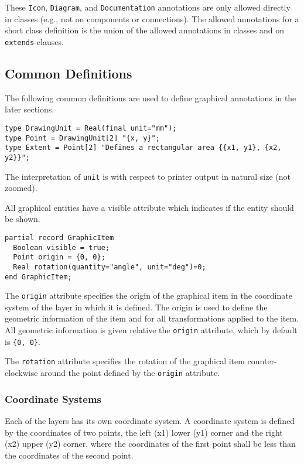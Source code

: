 These \lstinline!Icon!, \lstinline!Diagram!, and \lstinline!Documentation! annotations are only allowed directly in classes (e.g., not on components or connections).
The allowed annotations for a short class definition is the union of the allowed annotations in classes and on \lstinline!extends!-clauses.

\subsection{Common Definitions}\label{common-definitions}

The following common definitions are used to define graphical annotations in the later sections.
\begin{lstlisting}[language=modelica]
type DrawingUnit = Real(final unit="mm");
type Point = DrawingUnit[2] "{x, y}";
type Extent = Point[2] "Defines a rectangular area {{x1, y1}, {x2, y2}}";
\end{lstlisting}%
The interpretation of \lstinline!unit! is with respect to printer output in natural size (not zoomed).

All graphical entities have a visible attribute which indicates if the entity should be shown.
\begin{lstlisting}[language=modelica]
partial record GraphicItem
  Boolean visible = true;
  Point origin = {0, 0};
  Real rotation(quantity="angle", unit="deg")=0;
end GraphicItem;
\end{lstlisting}%
The \lstinline!origin! attribute specifies the origin of the graphical item in the coordinate system of the layer in which it is defined.
The origin is used to define the geometric information of the item and for all transformations applied to the item.
All geometric information is given relative the \lstinline!origin! attribute, which by default is \lstinline!{0, 0}!.

The \lstinline!rotation! attribute specifies the rotation of the graphical item counter-clockwise around the point defined by the \lstinline!origin! attribute.

\subsubsection{Coordinate Systems}\label{coordinate-systems}

Each of the layers has its own coordinate system.
A coordinate system is defined by the coordinates of two points, the left (x1) lower (y1) corner and the right (x2) upper (y2) corner, where the coordinates of the first point shall be less than the coordinates of the second point.

